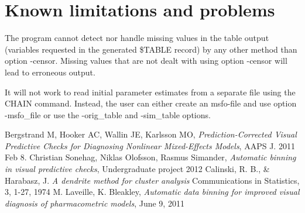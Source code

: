 \section{Known limitations and problems}
The program cannot detect nor handle missing values in the table output (variables 
requested in the generated \$TABLE record) by any other method than option -censor. Missing values that are not dealt with using option -censor will lead to erroneous output. 

It will not work to read initial parameter estimates from a separate file using the CHAIN command. Instead, the user can either create an msfo-file and use option -msfo\_file or use the -orig\_table and -sim\_table options.


\begin{thebibliography}{1}
 Bergstrand M, Hooker AC, Wallin JE, Karlsson MO, {\em Prediction-Corrected Visual Predictive Checks for Diagnosing Nonlinear Mixed-Effects Models}, AAPS J. 2011 Feb 8.
 Christian Sonehag, Niklas Olofsson, Rasmus Simander, {\em Automatic binning in visual predictive checks}, Undergraduate project 2012
 Calinski, R. B., \& Harabasz, J. {\em A dendrite method for cluster analysis} Communications in Statistics, 3, 1-27, 1974
 M. Laveille, K. Bleakley, {\em Automatic data binning for improved visual diagnosis of pharmacometric models}, June 9, 2011
\end{thebibliography}



